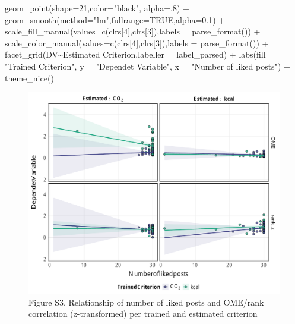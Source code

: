 \documentclass[
  letterpaper,
  DIV=11,
  numbers=noendperiod]{scrartcl}
\newenvironment{Shaded}{\begin{snugshade}}{\end{snugshade}}
\newcommand{\AttributeTok}[1]{\textcolor[rgb]{0.40,0.45,0.13}{#1}}
\newcommand{\ConstantTok}[1]{\textcolor[rgb]{0.56,0.35,0.01}{#1}}
\newcommand{\DecValTok}[1]{\textcolor[rgb]{0.68,0.00,0.00}{#1}}
\newcommand{\FloatTok}[1]{\textcolor[rgb]{0.68,0.00,0.00}{#1}}
\newcommand{\FunctionTok}[1]{\textcolor[rgb]{0.28,0.35,0.67}{#1}}
\newcommand{\NormalTok}[1]{\textcolor[rgb]{0.00,0.23,0.31}{#1}}
\newcommand{\SpecialCharTok}[1]{\textcolor[rgb]{0.37,0.37,0.37}{#1}}
\newcommand{\StringTok}[1]{\textcolor[rgb]{0.13,0.47,0.30}{#1}}
\begin{document}
\begin{Shaded}
\begin{Highlighting}[]
    \FunctionTok{geom\_point}\NormalTok{(}\AttributeTok{shape=}\DecValTok{21}\NormalTok{,}\AttributeTok{color=}\StringTok{"black"}\NormalTok{, }\AttributeTok{alpha=}\NormalTok{.}\DecValTok{8}\NormalTok{) }\SpecialCharTok{+}
    \FunctionTok{geom\_smooth}\NormalTok{(}\AttributeTok{method=}\StringTok{"lm"}\NormalTok{,}\AttributeTok{fullrange=}\ConstantTok{TRUE}\NormalTok{,}\AttributeTok{alpha=}\FloatTok{0.1}\NormalTok{) }\SpecialCharTok{+}
    \FunctionTok{scale\_fill\_manual}\NormalTok{(}\AttributeTok{values=}\FunctionTok{c}\NormalTok{(clrs[}\DecValTok{4}\NormalTok{],clrs[}\DecValTok{3}\NormalTok{]),}\AttributeTok{labels =} \FunctionTok{parse\_format}\NormalTok{()) }\SpecialCharTok{+}
    \FunctionTok{scale\_color\_manual}\NormalTok{(}\AttributeTok{values=}\FunctionTok{c}\NormalTok{(clrs[}\DecValTok{4}\NormalTok{],clrs[}\DecValTok{3}\NormalTok{]),}\AttributeTok{labels =} \FunctionTok{parse\_format}\NormalTok{()) }\SpecialCharTok{+}
    \FunctionTok{facet\_grid}\NormalTok{(DV}\SpecialCharTok{\textasciitilde{}}\StringTok{\textasciigrave{}}\AttributeTok{Estimated Criterion}\StringTok{\textasciigrave{}}\NormalTok{,}\AttributeTok{labeller =}\NormalTok{ label\_parsed) }\SpecialCharTok{+}
    \FunctionTok{labs}\NormalTok{(}\AttributeTok{fill  =} \StringTok{"Trained Criterion"}\NormalTok{, }
         \AttributeTok{y     =} \StringTok{"Dependet Variable"}\NormalTok{,}
         \AttributeTok{x     =} \StringTok{"Number of liked posts"}\NormalTok{) }\SpecialCharTok{+}
    \FunctionTok{theme\_nice}\NormalTok{()}
\end{Highlighting}
\end{Shaded}

\begin{figure}[H]

{\centering \includegraphics{supplement_files/figure-pdf/unnamed-chunk-6-1.pdf}

}

\caption{Figure S3. Relationship of number of liked posts and OME/rank
correlation (z-transformed) per trained and estimated criterion}

\end{figure}%
\end{document}
